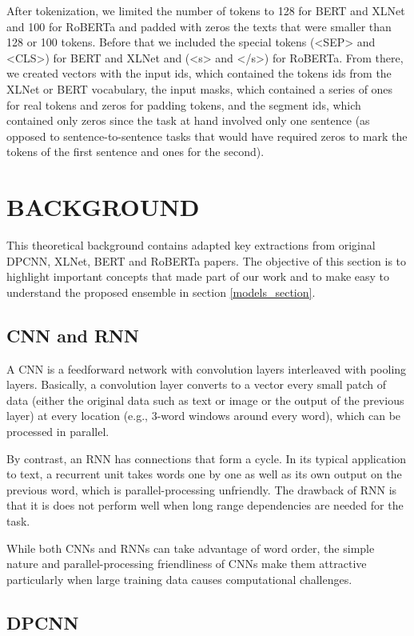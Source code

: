 \documentclass{article}
\begin{document}
After tokenization, we limited the number of tokens to 128 for BERT and XLNet and 100 for RoBERTa and padded with zeros the texts that were smaller than 128 or 100 tokens. Before that we included the special tokens (<SEP> and <CLS>) for BERT and XLNet and (<s> and </s>) for RoBERTa. From there, we created vectors with the input ids, which contained the tokens ids from the XLNet or BERT vocabulary, the input masks, which contained a series of ones for real tokens and zeros for padding tokens, and the segment ids, which contained only zeros since the task at hand involved only one sentence (as opposed to sentence-to-sentence tasks that would have required zeros to mark the tokens of the first sentence and ones for the second).

\section{BACKGROUND} \label{background_section}

This theoretical background contains adapted key extractions from original DPCNN, XLNet, BERT and RoBERTa papers. The objective of this section is to highlight important concepts that made part of our work and to make easy to understand the proposed ensemble in section \ref{models_section}.

\subsection{CNN and RNN}

A CNN is a feedforward network with convolution layers interleaved with pooling layers. Basically, a convolution layer converts to a vector every small patch of data (either the original data such as text or image or the output of the previous layer) at every location (e.g., 3-word windows around every word), which can be processed in parallel.

By contrast, an RNN has connections that form a cycle. In its typical application to text, a recurrent unit takes words one by one as well as its own output on the previous word, which is parallel-processing unfriendly. The drawback of RNN is that it is does not perform well when long range dependencies are needed for the task. 

While both CNNs and RNNs can take advantage of word order, the simple nature and parallel-processing friendliness of CNNs make them attractive particularly when large training data causes computational challenges.

\subsection{DPCNN}
\end{document}
